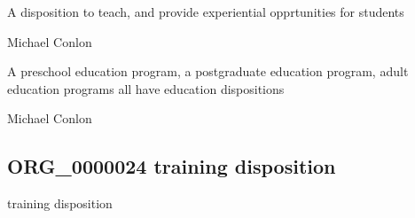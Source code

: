 \documentclass[letterpaper,10pt,english]{sphinxmanual}
\begin{document}
\begin{sphinxShadowBox}

\sphinxAtStartPar
{\hyperref[\detokenize{doc-BFO_0000016::doc}]{}}
\end{sphinxShadowBox}

\begin{sphinxShadowBox}

\sphinxAtStartPar
A disposition to teach, and provide experiential opprtunities for students
\end{sphinxShadowBox}

\begin{sphinxShadowBox}

\sphinxAtStartPar
Michael Conlon 
\end{sphinxShadowBox}

\begin{sphinxShadowBox}

\sphinxAtStartPar
A pre\sphinxhyphen{}school education program, a post\sphinxhyphen{}graduate education program, adult education programs all have education dispositions
\end{sphinxShadowBox}

\begin{sphinxShadowBox}

\sphinxAtStartPar
Michael Conlon 
\end{sphinxShadowBox}
\begin{quote}

\ignorespaces \end{quote}


\subsection{ORG\_0000024 \sphinxhyphen{} training disposition}
\label{\detokenize{doc-ORG_0000024:org-0000024-training-disposition}}\label{\detokenize{doc-ORG_0000024:index-0}}\label{\detokenize{doc-ORG_0000024::doc}}
\begin{sphinxShadowBox}

\sphinxAtStartPar
training disposition
\end{sphinxShadowBox}
\end{document}
